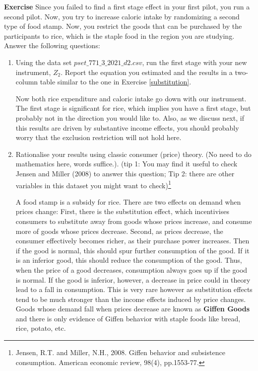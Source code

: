 \documentclass[10pt]{article}
\newcounter{exercise}
\newenvironment{exercise}%
{%
	\refstepcounter{exercise}%
	\textbf{Exercise \theexercise}%
	}%
{
 \par\vspace{\baselineskip}%
\noindent\ignorespacesafterend
}
\begin{document}

\begin{exercise}\label{giffen}
	Since you failed to find a first stage effect in your first pilot, you run a second pilot. Now, you try to increase caloric intake by randomizing a second type of food stamp. Now, you restrict the goods that can be purchased by the participants to rice, which is the staple food in the region you are studying. Answer the following questions:
	\begin{enumerate}
		\item Using the data set $pset\_771\_3\_2021\_d2.csv$, run the first stage with your new instrument, $ Z_{2} $. Report the equation you estimated and the results in a two-column table similar to the one in Exercise \ref{substitution}. 
		\color{red}
		
		Now both rice expenditure and caloric intake go down with our instrument. The first stage is significant for rice, which implies you have a first stage, but probably not in the direction you would like to. Also, as we discuss next, if this results are driven by substantive income effects, you should probably worry that the exclusion restriction will not hold here.
		
		
		
		\color{black}
		
		\item Rationalise your results using classic consumer (price) theory. (No need to do mathematics here, words suffice.). (tip 1: You may find it useful to check Jensen and Miller (2008) to answer this question; Tip 2: there are other variables in this dataset you might want to check)\footnote{Jensen, R.T. and Miller, N.H., 2008. Giffen behavior and subsistence consumption. American economic review, 98(4), pp.1553-77.}
		
		\color{red}
			A food stamp is a subsidy for rice. There are two effects on demand when prices change: First, there is the substitution effect, which incentivises consumers to substitute away from goods whose prices increase, and consume more of goods whose prices decrease. Second, as prices decrease, the consumer effectively becomes richer, as their purchase power increases. Then if the good is normal, this should spur further consumption of the good. If it is an inferior good, this should reduce the consumption of the good. Thus, when the price of a good decreases, consumption always goes up if the good is normal. If the good is inferior, however, a decrease in price could in theory lead to a fall in consumption. This is very rare however as substitution effects tend to be much stronger than the income effects induced by price changes. Goods whose demand fall when prices decrease are known as \textbf{Giffen Goods} and there is only evidence of Giffen behavior with staple foods like bread, rice, potato, etc. 
			

\end{enumerate}
\end{exercise}
\end{document}
